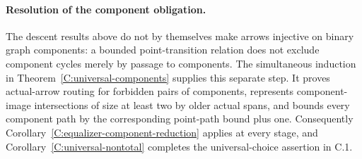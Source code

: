 \paragraph{Resolution of the component obligation.}
The descent results above do not by themselves make arrows
injective on binary graph components: a bounded point-transition
relation does not exclude component cycles merely by passage to
components. The simultaneous induction in
Theorem~\ref{C:universal-components} supplies this separate step.
It proves actual-arrow routing for forbidden pairs of components,
represents component-image intersections of size at least two
by older actual spans, and bounds every component path by the
corresponding point-path bound plus one. Consequently
Corollary~\ref{C:equalizer-component-reduction} applies at every
stage, and Corollary~\ref{C:universal-nontotal} completes the
universal-choice assertion in C.1.
